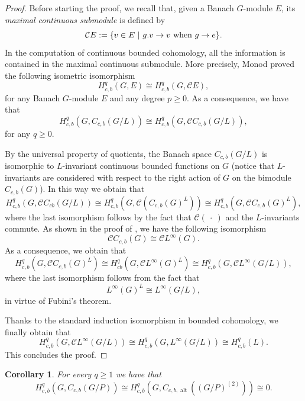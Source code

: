 \documentclass[a4paper]{amsart}
\newtheorem{cor}[lem]{Corollary}
\theoremstyle{definition}
\theoremstyle{remark}
\theoremstyle{TheoremNum}
\DeclareMathOperator{\alt}{\mathrm{alt}}
\begin{document}
\begin{proof}
Before starting the proof, we recall that, given a Banach $G$-module $E$, its \emph{maximal continuous submodule} is defined by
$$
\mathcal{C}E:=\{ v \in E \ | \ g.v \rightarrow v \ \textup{when} \  g \rightarrow e\}. 
$$
In the computation of continuous bounded cohomology, all the information is contained in the maximal continuous submodule. More precisely, Monod \cite[Proposition 6.1.5]{Monodbook} proved the following isometric isomorphism
$$
H^q_{c,b}(G,E) \cong H^q_{c,b}(G,\mathcal{C}E),
$$
for any Banach $G$-module $E$ and any degree $p \geq 0$. As a consequence, we have that 
$$
H^q_{c,b}(G,C_{c,b}(G/L)) \cong H^q_{c,b}(G,\mathcal{C}C_{c,b}(G/L)),
$$
for any $q \geq 0$.

By the universal property of quotients, the Banach space $C_{c,b}(G/L)$ is isomorphic to $L$-invariant continuous bounded functions on $G$ (notice that $L$-invariants are considered with respect to the right action of $G$ on the bimodule $C_{c,b}(G)$). In this way we obtain that 
$$
H^q_{c,b}(G,\mathcal{C}C_{cb}(G/L)) \cong H^q_{c,b}(G,\mathcal{C}(C_{c,b}(G)^L)) \cong H^q_{c,b}(G,\mathcal{C}C_{c,b}(G)^L),
$$
where the last isomorphism follows by the fact that $\mathcal{C}( \ \cdot \ )$ and the $L$-invariants commute. As shown in the proof of \cite[Proposition 4.4.2]{Monodbook}, we have the following isomorphism
$$
\mathcal{C}C_{c,b}(G) \cong \mathcal{C}L^\infty(G). 
$$
As a consequence, we obtain that 
$$
H^q_{c,b}(G,\mathcal{C}C_{c,b}(G)^L) \cong H^q_{cb}(G,\mathcal{C}L^\infty(G)^L) \cong H^q_{c,b}(G,\mathcal{C}L^\infty(G/L)), 
$$
where the last isomorphism follows from the fact that 
$$
L^\infty(G)^L \cong L^\infty(G/L),
$$
in virtue of Fubini's theorem. 

Thanks to the standard induction isomorphism \cite[Proposition 10.1.3]{Monodbook} in bounded cohomology, we finally obtain that 
$$
H^q_{c,b}(G,\mathcal{C}L^\infty(G/L)) \cong H^q_{c,b}(G,L^\infty(G/L)) \cong H^q_{c,b}(L).
$$
This concludes the proof. 
\end{proof}

\begin{cor}\label{cor second third columns}
For every $q \geq 1$ we have that 
$$
H^q_{c,b}(G,C_{c,b}(G/P)) \cong H^q_{c,b}(G,C_{c,b,\alt}((G/P)^{(2)})) \cong 0. 
$$
\end{cor}
\end{document}
